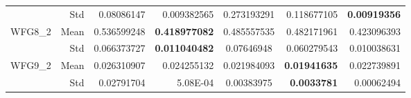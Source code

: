 \begin{table*}[htbp]
\begin{tabular}{rrrrrrr}
          & Std   & 0.08086147 & 0.009382565 & \multicolumn{1}{c}{0.273193291} & 0.118677105 & \textbf{0.00919356} \\
    \multirow{2}[0]{*}{WFG8\_2} & Mean  & 0.536599248 & \textbf{0.418977082} & \multicolumn{1}{c}{0.485557535} & 0.482171961 & 0.423096393 \\
          & Std   & 0.066373727 & \textbf{0.011040482} & \multicolumn{1}{c}{0.07646948} & 0.060279543 & 0.010038631 \\
    \multirow{2}[0]{*}{WFG9\_2} & Mean  & 0.026310907 & 0.024255132 & \multicolumn{1}{c}{0.021984093} & \textbf{0.01941635} & 0.022739891 \\
          & Std   & 0.02791704 & 5.08E-04 & \multicolumn{1}{c}{0.00383975} & \textbf{0.0033781} & 0.00062494 \\
    \bottomrule
    \end{tabular}%
  \label{tab:wfgigd}%
\end{table*}%
